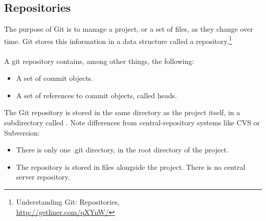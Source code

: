 
\newpage
\subsection{Repositories}
The purpose of Git is to manage a project, or a set of files, as
they change over time.  Git stores this information in a data
structure called a repository.\footnote{Understanding Git: Repositories,\\
\href{http://getliner.com/qXYnW/}{http://getliner.com/qXYnW/}}
\\
\\
A git repository contains, among other things, the following:

\begin{itemize}
  \item{A set of commit objects.}
  \item{A set of references to commit objects, called heads.}
\end{itemize}

\noindent The Git repository is stored in the same directory as
the project itself, in a subdirectory called .  Note
differences from central-repository systems like CVS or
Subversion:

\begin{itemize}
  \item{There is only one .git directory,
        in the root directory of the project.}
  \item{The repository is stored in files alongside the project.
        There is no central server repository.}
\end{itemize}




